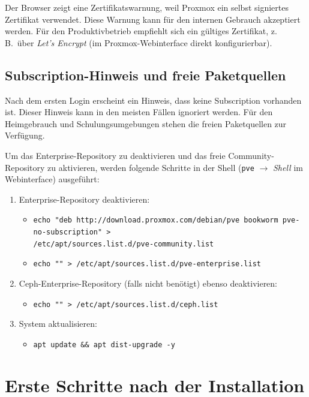 \documentclass[11pt, oneside, numbers=noenddot]{scrbook}
\begin{document}
Der Browser zeigt eine Zertifikatswarnung, weil Proxmox ein selbst signiertes Zertifikat verwendet. Diese Warnung kann für den internen Gebrauch akzeptiert werden. Für den Produktivbetrieb empfiehlt sich ein gültiges Zertifikat, z.\,B.\ über \textit{Let's Encrypt} (im Proxmox-Webinterface direkt konfigurierbar).

\section{Subscription-Hinweis und freie Paketquellen}
Nach dem ersten Login erscheint ein Hinweis, dass keine Subscription vorhanden ist. Dieser Hinweis kann in den meisten Fällen ignoriert werden. Für den Heimgebrauch und Schulungsumgebungen stehen die freien Paketquellen zur Verfügung.

Um das Enterprise-Repository zu deaktivieren und das freie Community-Repository zu aktivieren, werden folgende Schritte in der Shell (\texttt{pve} $\rightarrow$ \textit{Shell} im Webinterface) ausgeführt:

\begin{enumerate}
  \item Enterprise-Repository deaktivieren:
  \begin{itemize}
    \item \texttt{echo "deb http://download.proxmox.com/debian/pve bookworm pve-no-subscription" >}\\
          \texttt{/etc/apt/sources.list.d/pve-community.list}
    \item \texttt{echo ""\,> /etc/apt/sources.list.d/pve-enterprise.list}
  \end{itemize}
  \item Ceph-Enterprise-Repository (falls nicht benötigt) ebenso deaktivieren:
  \begin{itemize}
    \item \texttt{echo ""\,> /etc/apt/sources.list.d/ceph.list}
  \end{itemize}
  \item System aktualisieren:
  \begin{itemize}
    \item \texttt{apt update \&\& apt dist-upgrade -y}
  \end{itemize}
\end{enumerate}



\chapter{Erste Schritte nach der Installation}
\end{document}

